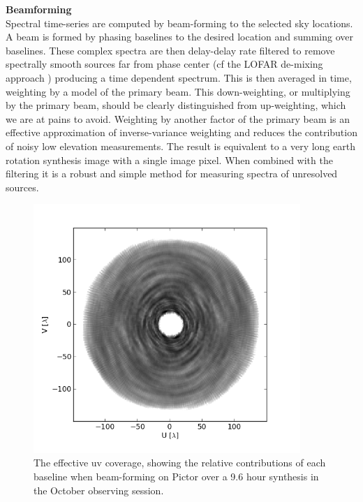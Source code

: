 \documentclass[preprint]{aastex}
\begin{document}
\textbf{Beamforming}\\
Spectral time-series are computed by beam-forming to the selected sky locations. A beam is formed by phasing baselines to the desired location and summing over baselines.  %
 These complex spectra are then delay-delay rate filtered to remove spectrally smooth sources far from phase center \citep{Parsons:2009p7859} (cf the LOFAR de-mixing approach \cite{Offringa:2012p9691})  producing a time dependent spectrum. This is then averaged in time,  weighting by a model of the primary beam. This down-weighting, or multiplying by the primary beam, should be clearly distinguished from up-weighting, which we are at pains to avoid.  Weighting by another factor of the primary beam is an effective approximation of inverse-variance weighting \citep{Pober:2012p8800} and reduces the contribution of noisy low elevation measurements.  The result is equivalent to a very long earth rotation synthesis image with a single image pixel. When combined with the filtering it is a robust and simple method for measuring spectra of unresolved sources. 
\begin{figure}
\includegraphics[width=0.9\textwidth]{plots/PicA_Oct2011_uv_coverage.png}
\caption{The effective uv coverage, showing the relative contributions of each baseline when beam-forming on Pictor over a 9.6 hour synthesis in the October observing session. \label{fig:uv_coverage}}
\end{figure}
\end{document}
